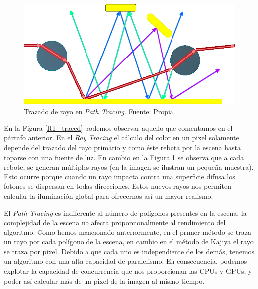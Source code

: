 \documentclass[titlepage,12pt]{report}
\begin{document}
\begin{figure}[!ht]
	\centering
	\includegraphics[scale=0.45]{media/lightPathPT.png}
	\caption{Trazado de rayo en \textit{Path Tracing}. Fuente: Propia}
	\label{PT_traced}
\end{figure}

En la Figura \ref{RT_traced} podemos observar aquello que comentamos en el párrafo anterior. En el \textit{Ray Tracing} el cálculo del color en un pixel solamente depende del trazado del rayo primario y como éste rebota por la escena hasta toparse con una fuente de luz. En cambio en la Figura \ref{PT_traced} se observa que a cada rebote, se generan múltiples rayos (en la imagen se ilustran un pequeña muestra). Esto ocurre porque cuando un rayo impacta contra una superficie difusa los fotones se dispersan en todas direcciones. Estos nuevos rayos nos permiten calcular la iluminación global para ofrecernos así un mayor realismo. 

El \textit{Path Tracing} es indiferente al número de polígonos presentes en la escena, la complejidad de la escena no afecta proporcionalmente al rendimiento del algoritmo. Como hemos mencionado anteriormente, en el primer método se traza un rayo por cada polígono de la escena, en cambio en el método de Kajiya el rayo se traza por pixel. Debido a que cada uno es independiente de los demás, tenemos un algoritmo con una alta capacidad de paralelismo. En consecuencia, podemos explotar la capacidad de concurrencia que nos proporcionan las CPUs y GPUs; y poder así calcular más de un pixel de la imagen al mismo tiempo.
\end{document}
